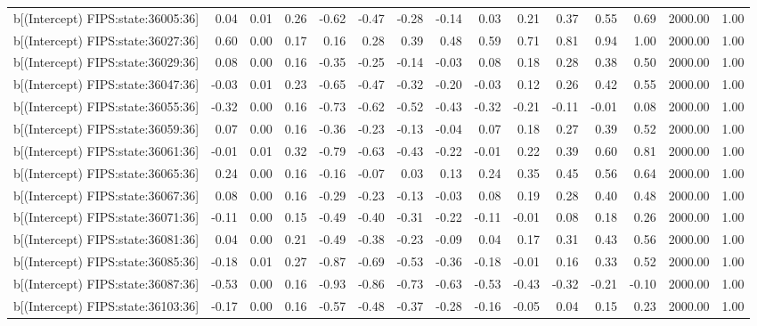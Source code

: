 \begin{table}[ht]
\begin{tabular}{rrrrrrrrrrrrrrr}
  b[(Intercept) FIPS:state:36005:36] & 0.04 & 0.01 & 0.26 & -0.62 & -0.47 & -0.28 & -0.14 & 0.03 & 0.21 & 0.37 & 0.55 & 0.69 & 2000.00 & 1.00 \\ 
  b[(Intercept) FIPS:state:36027:36] & 0.60 & 0.00 & 0.17 & 0.16 & 0.28 & 0.39 & 0.48 & 0.59 & 0.71 & 0.81 & 0.94 & 1.00 & 2000.00 & 1.00 \\ 
  b[(Intercept) FIPS:state:36029:36] & 0.08 & 0.00 & 0.16 & -0.35 & -0.25 & -0.14 & -0.03 & 0.08 & 0.18 & 0.28 & 0.38 & 0.50 & 2000.00 & 1.00 \\ 
  b[(Intercept) FIPS:state:36047:36] & -0.03 & 0.01 & 0.23 & -0.65 & -0.47 & -0.32 & -0.20 & -0.03 & 0.12 & 0.26 & 0.42 & 0.55 & 2000.00 & 1.00 \\ 
  b[(Intercept) FIPS:state:36055:36] & -0.32 & 0.00 & 0.16 & -0.73 & -0.62 & -0.52 & -0.43 & -0.32 & -0.21 & -0.11 & -0.01 & 0.08 & 2000.00 & 1.00 \\ 
  b[(Intercept) FIPS:state:36059:36] & 0.07 & 0.00 & 0.16 & -0.36 & -0.23 & -0.13 & -0.04 & 0.07 & 0.18 & 0.27 & 0.39 & 0.52 & 2000.00 & 1.00 \\ 
  b[(Intercept) FIPS:state:36061:36] & -0.01 & 0.01 & 0.32 & -0.79 & -0.63 & -0.43 & -0.22 & -0.01 & 0.22 & 0.39 & 0.60 & 0.81 & 2000.00 & 1.00 \\ 
  b[(Intercept) FIPS:state:36065:36] & 0.24 & 0.00 & 0.16 & -0.16 & -0.07 & 0.03 & 0.13 & 0.24 & 0.35 & 0.45 & 0.56 & 0.64 & 2000.00 & 1.00 \\ 
  b[(Intercept) FIPS:state:36067:36] & 0.08 & 0.00 & 0.16 & -0.29 & -0.23 & -0.13 & -0.03 & 0.08 & 0.19 & 0.28 & 0.40 & 0.48 & 2000.00 & 1.00 \\ 
  b[(Intercept) FIPS:state:36071:36] & -0.11 & 0.00 & 0.15 & -0.49 & -0.40 & -0.31 & -0.22 & -0.11 & -0.01 & 0.08 & 0.18 & 0.26 & 2000.00 & 1.00 \\ 
  b[(Intercept) FIPS:state:36081:36] & 0.04 & 0.00 & 0.21 & -0.49 & -0.38 & -0.23 & -0.09 & 0.04 & 0.17 & 0.31 & 0.43 & 0.56 & 2000.00 & 1.00 \\ 
  b[(Intercept) FIPS:state:36085:36] & -0.18 & 0.01 & 0.27 & -0.87 & -0.69 & -0.53 & -0.36 & -0.18 & -0.01 & 0.16 & 0.33 & 0.52 & 2000.00 & 1.00 \\ 
  b[(Intercept) FIPS:state:36087:36] & -0.53 & 0.00 & 0.16 & -0.93 & -0.86 & -0.73 & -0.63 & -0.53 & -0.43 & -0.32 & -0.21 & -0.10 & 2000.00 & 1.00 \\ 
  b[(Intercept) FIPS:state:36103:36] & -0.17 & 0.00 & 0.16 & -0.57 & -0.48 & -0.37 & -0.28 & -0.16 & -0.05 & 0.04 & 0.15 & 0.23 & 2000.00 & 1.00 \\ 

\end{tabular}
\end{table}
